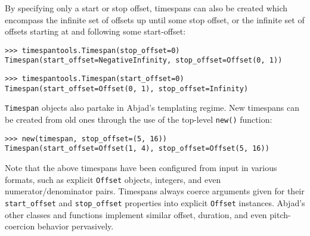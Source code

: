 \noindent By specifying only a start or stop offset, timespans can also be
created which encompass the infinite set of offsets up until some stop offset,
or the infinite set of offsets starting at and following some start-offset:

\begin{comment}
<abjad>
timespantools.Timespan(stop_offset=0)
timespantools.Timespan(start_offset=0)
</abjad>
\end{comment}

\begin{abjadbookoutput}
\begin{singlespacing}
\vspace{-0.5\baselineskip}
\begin{verbatim}
>>> timespantools.Timespan(stop_offset=0)
Timespan(start_offset=NegativeInfinity, stop_offset=Offset(0, 1))
\end{verbatim}
\begin{verbatim}
>>> timespantools.Timespan(start_offset=0)
Timespan(start_offset=Offset(0, 1), stop_offset=Infinity)
\end{verbatim}
\end{singlespacing}
\end{abjadbookoutput}

\noindent \texttt{Timespan} objects also partake in Abjad's templating regime.
New timespans can be created from old ones through the use of the top-level
\texttt{new()} function:

\begin{comment}
<abjad>
new(timespan, stop_offset=(5, 16))
</abjad>
\end{comment}

\begin{abjadbookoutput}
\begin{singlespacing}
\vspace{-0.5\baselineskip}
\begin{verbatim}
>>> new(timespan, stop_offset=(5, 16))
Timespan(start_offset=Offset(1, 4), stop_offset=Offset(5, 16))
\end{verbatim}
\end{singlespacing}
\end{abjadbookoutput}

\noindent Note that the above timespans have been configured from input in
various formats, such as explicit \texttt{Offset} objects, integers, and even
numerator/denominator pairs. Timespans always coerce arguments given for their
\texttt{start\_offset} and \texttt{stop\_offset} properties into explicit
\texttt{Offset} instances. Abjad's other classes and functions implement
similar offset, duration, and even pitch-coercion behavior pervasively.

